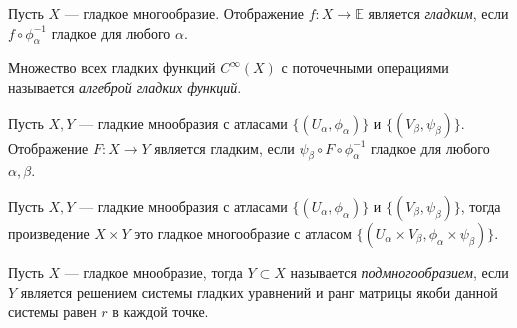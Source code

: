 \begin{ass}
Пусть $X$ — гладкое многообразие. Отображение $f:X\to\mathbb{E}$ является \textit{гладким}, если $f\circ \phi_\alpha^{-1}$ гладкое для любого $\alpha$.
\end{ass}

\begin{defi}
Множество всех гладких функций $C^\infty(X)$ с поточечными операциями называется \textit{алгеброй гладких функций}.
\end{defi}

\begin{ass}
Пусть ${X,Y}$ — гладкие мнообразия с атласами  $\{(U_\alpha,\phi_\alpha)\}$  и  $\{(V_\beta,\psi_\beta)\}$. Отображение ${F:X\to Y}$ является гладким, если ${\psi_\beta\circ F\circ\phi_\alpha^{-1}}$ гладкое для любого $\alpha,\beta$.
\end{ass}

\begin{defi}
Пусть ${X,Y}$ — гладкие мнообразия с атласами  $\{(U_\alpha,\phi_\alpha)\}$  и  $\{(V_\beta,\psi_\beta)\}$, тогда произведение $X\times Y$ это гладкое многообразие с атласом  $\{(U_\alpha\times V_\beta,\phi_\alpha\times\psi_\beta)\}$.
\end{defi}

\begin{defi}
Пусть $X$ — гладкое мнообразие, тогда $Y\subset X$ называется \textit{подмногообразием}, если $Y$ является решением системы гладких уравнений и ранг матрицы якоби данной системы равен $r$ в каждой точке.
\end{defi}
